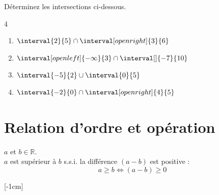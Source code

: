 \documentclass[main.tex]{subfiles}
\begin{document}
\begin{exercise}[entrainement] Déterminez les intersections ci-dessous.
	\vspace{-1em}
	\begin{multicols}{4}
	\begin{enumerate}[leftmargin=*,label={}]
		\item $\interval{2}{5}\cap \interval[open right]{3}{6}$\dotfill 
		\item $\interval[open left]{-\infty}{3}\cap \interval[]{-7}{10}$\dotfill
		\item $\interval{-5}{2}\cup \interval{0}{5}$\dotfill
		\item $\interval{-2}{0}\cap \interval[open right]{4}{5}$\dotfill
	\end{enumerate} 
	\end{multicols}
\end{exercise} 

\newpage 
{}  
\pagestyle{scrheadings} %
\onehalfspacing
\section{Relation d'ordre et opération}
\begin{definition}
	$a$ et $b\in \mathbb{R}$. \\
	$a$ est supérieur à $b$ s.s.i. la différence $(a-b)$ est positive :
	\[
	a\geqslant b \iff (a-b)\geqslant 0
	\]  
\end{definition} 
[-1cm]
\end{document}
